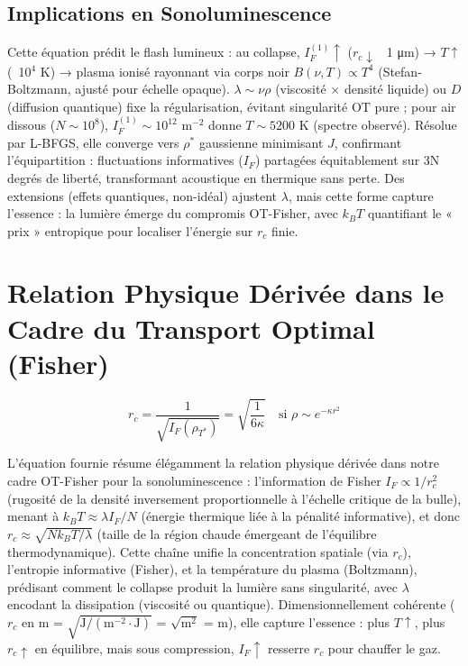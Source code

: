 \documentclass[a4paper,12pt]{article}
\begin{document}
\subsection{Implications en Sonoluminescence}
Cette équation prédit le flash lumineux : au collapse, \( I_F^{(1)} \uparrow \) (\( r_c \downarrow \) ~1 μm) → \( T \uparrow \) (~10\(^4\) K) → plasma ionisé rayonnant via corps noir \( B(\nu, T) \propto T^4 \) (Stefan-Boltzmann, ajusté pour échelle opaque). \(\lambda \sim \nu \rho\) (viscosité × densité liquide) ou \(D\) (diffusion quantique) fixe la régularisation, évitant singularité OT pure ; pour air dissous (\(N \sim 10^8\)), \( I_F^{(1)} \sim 10^{12} \) m\(^{-2}\) donne \( T \sim 5200 \) K (spectre observé). Résolue par L-BFGS, elle converge vers \(\rho^*\) gaussienne minimisant \(J\), confirmant l'équipartition : fluctuations informatives (\(I_F\)) partagées équitablement sur 3N degrés de liberté, transformant acoustique en thermique sans perte. Des extensions (effets quantiques, non-idéal) ajustent \(\lambda\), mais cette forme capture l'essence : la lumière émerge du compromis OT-Fisher, avec \(k_B T\) quantifiant le « prix » entropique pour localiser l'énergie sur \(r_c\) finie.
\newpage
\section{Relation Physique Dérivée dans le Cadre du Transport Optimal (Fisher)}

\begin{equation}
\boxed{
r_c = \frac{1}{\sqrt{I_F(\rho_{T^*})}} = \sqrt{\frac{1}{6\kappa}} \quad \text{si } \rho \sim e^{-\kappa r^2}
}
\end{equation}
\label{eq:rc-if-kappa}

L'équation fournie résume élégamment la relation physique dérivée dans notre cadre OT-Fisher pour la sonoluminescence : l'information de Fisher \( I_F \propto 1 / r_c^2 \) (rugosité de la densité inversement proportionnelle à l'échelle critique de la bulle), menant à \( k_B T \approx \lambda I_F / N \) (énergie thermique liée à la pénalité informative), et donc \( r_c \approx \sqrt{N k_B T / \lambda} \) (taille de la région chaude émergeant de l'équilibre thermodynamique). Cette chaîne unifie la concentration spatiale (via \( r_c \)), l'entropie informative (Fisher), et la température du plasma (Boltzmann), prédisant comment le collapse produit la lumière sans singularité, avec \( \lambda \) encodant la dissipation (viscosité ou quantique). Dimensionnellement cohérente (\( r_c \) en m = \(\sqrt{\text{J} / (\text{m}^{-2} \cdot \text{J})}\) = \(\sqrt{\text{m}^2}\) = m), elle capture l'essence : plus \( T \uparrow \), plus \( r_c \uparrow \) en équilibre, mais sous compression, \( I_F \uparrow \) resserre \( r_c \) pour chauffer le gaz.
\end{document}
